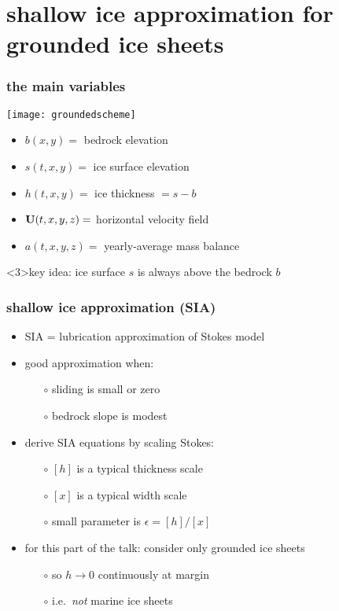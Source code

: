\documentclass{beamer}
\newcommand{\eps}{\epsilon}
\begin{document}
\section[shallow ice approximation]{shallow ice approximation for grounded ice sheets}


\begin{frame}
  \frametitle{the main variables}

\begin{center}
\texttt{[image: groundedscheme]}
\end{center}

\begin{itemize}
\small
\item $b(x,y)=$ bedrock elevation
\item $s(t,x,y)=$ ice surface elevation
\item $h(t,x,y)=$ ice thickness $ = s-b$
\item ${\bf U}(t,x,y,z)=$ horizontal velocity field
\item $a(t,x,y,z)=$ yearly-average mass balance 
\end{itemize}

\begin{alertblock}<3>{key idea: ice surface $s$ is always above the bedrock $b$}
\end{alertblock}
\end{frame}


\begin{frame}
  \frametitle{shallow ice approximation (SIA)}

\begin{itemize}
\item SIA = lubrication approximation of Stokes model
\item good approximation when:
  \begin{itemize}
  \item[$\circ$] sliding is small or zero
  \item[$\circ$] bedrock slope is modest
  \end{itemize}
\item derive SIA equations by scaling Stokes:
  \begin{itemize}
  \item[$\circ$] $[h]$ is a typical thickness scale
  \item[$\circ$] $[x]$ is a typical width scale
  \item[$\circ$] small parameter is $\eps = [h] / [x]$
  \end{itemize}
\item for this part of the talk: consider only grounded ice sheets
  \begin{itemize}
  \item[$\circ$] so $h \to 0$ continuously at margin
  \item[$\circ$] i.e.~\emph{not} marine ice sheets
  \end{itemize}
\end{itemize}
\end{frame}
\end{document}
